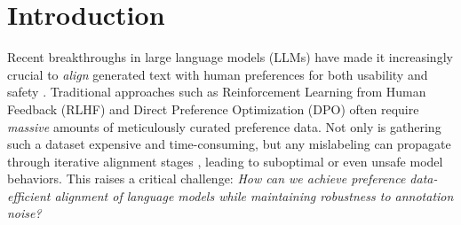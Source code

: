 %







\section{Introduction}
\label{sec:intro}
Recent breakthroughs in large language models (LLMs) have made it increasingly crucial to \emph{align} generated text with human preferences for both usability and safety \citep{Ouyang2022Training,Bai2022Training}. Traditional approaches such as Reinforcement Learning from Human Feedback (RLHF) \citep{Christiano2017Deep} and Direct Preference Optimization (DPO) \citep{Rafailov2023Direct} often require \emph{massive} amounts of meticulously curated preference data. Not only is gathering such a dataset expensive and time-consuming, but any mislabeling can propagate through iterative alignment stages \citep{Casper2023Open}, leading to suboptimal or even unsafe model behaviors. This raises a critical challenge: \emph{How can we achieve preference data-efficient alignment of language models while maintaining robustness to annotation noise?}

